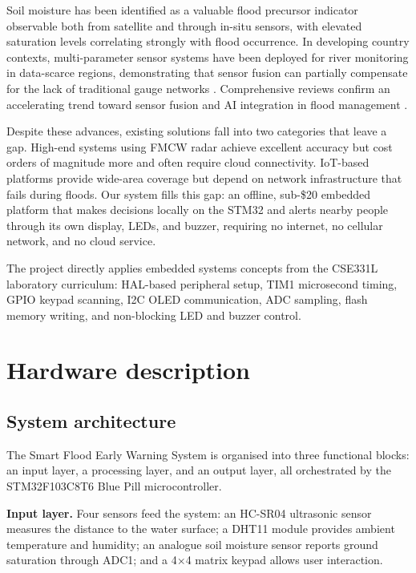 \documentclass[5p,twocolumn]{elsarticle}
\begin{document}
Soil moisture has been identified as a valuable flood precursor indicator observable both from satellite \cite{tangdamrongsub2021} and through in-situ sensors, with elevated saturation levels correlating strongly with flood occurrence. In developing country contexts, multi-parameter sensor systems have been deployed for river monitoring in data-scarce regions, demonstrating that sensor fusion can partially compensate for the lack of traditional gauge networks \cite{mdegela2023}. Comprehensive reviews confirm an accelerating trend toward sensor fusion and AI integration in flood management \cite{tao2024}.

Despite these advances, existing solutions fall into two categories that leave a gap. High-end systems using FMCW radar \cite{shui2022,zeng2025} achieve excellent accuracy but cost orders of magnitude more and often require cloud connectivity. IoT-based platforms \cite{rohan2025,boulouard2022} provide wide-area coverage but depend on network infrastructure that fails during floods. Our system fills this gap: an offline, sub-\$20 embedded platform that makes decisions locally on the STM32 and alerts nearby people through its own display, LEDs, and buzzer, requiring no internet, no cellular network, and no cloud service.

The project directly applies embedded systems concepts from the CSE331L laboratory curriculum: HAL-based peripheral setup, TIM1 microsecond timing, GPIO keypad scanning, I2C OLED communication, ADC sampling, flash memory writing, and non-blocking LED and buzzer control.


\section{Hardware description}

\subsection{System architecture}

The Smart Flood Early Warning System is organised into three functional blocks: an input layer, a processing layer, and an output layer, all orchestrated by the STM32F103C8T6 Blue Pill microcontroller.

\textbf{Input layer.} Four sensors feed the system: an HC-SR04 ultrasonic sensor measures the distance to the water surface; a DHT11 module provides ambient temperature and humidity; an analogue soil moisture sensor reports ground saturation through ADC1; and a 4$\times$4 matrix keypad allows user interaction.
\end{document}
